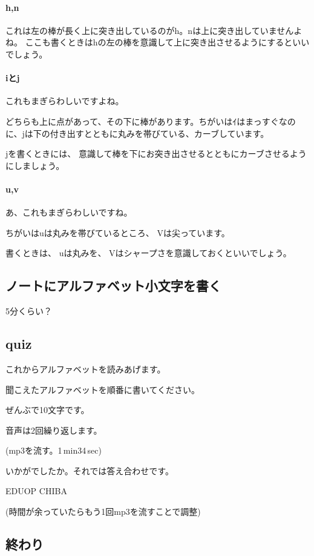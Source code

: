 \documentclass[12pt]{jlreq}
\begin{document}
\paragraph{h,n}

これは左の棒が長く上に突き出しているのがh。nは上に突き出していませんよね。
ここも書くときはhの左の棒を意識して上に突き出させるようにするといいでしょう。

\paragraph{iとj}
これもまぎらわしいですよね。

どちらも上に点があって、その下に棒があります。ちがいはｲはまっすぐなのに、jは下の付き出すとともに丸みを帯びている、カーブしています。

jを書くときには、
意識して棒を下にお突き出させるとともにカーブさせるようにしましょう。

\paragraph{u,v}

あ、これもまぎらわしいですね。

ちがいはuは丸みを帯びているところ、
Vは尖っています。

書くときは、
uは丸みを、
Vはシャープさを意識しておくといいでしょう。

\subsection{ノートにアルファベット小文字を書く}

5分くらい？

\subsection{quiz}

これからアルファベットを読みあげます。

聞こえたアルファベットを順番に書いてください。

ぜんぶで10文字です。

音声は2回繰り返します。

(mp3を流す。1\,min34\,sec)

いかがでしたか。それでは答え合わせです。

EDUOP CHIBA

(時間が余っていたらもう1回mp3を流すことで調整)
\subsection{終わり}
\end{document}
